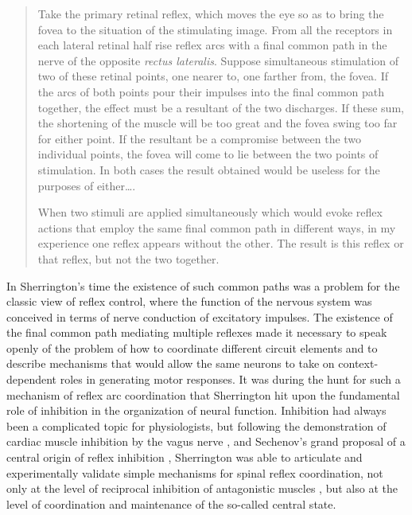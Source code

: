 \blockquote[{\protect\cite[p.461]{Sherrington1904}}]{Take the primary retinal reflex, which moves the eye so as to bring the fovea to the situation of the stimulating image. From all the receptors in each lateral retinal half rise reflex arcs with a final common path in the nerve of the opposite \emph{rectus lateralis}. Suppose simultaneous stimulation of two of these retinal points, one nearer to, one farther from, the fovea. If the arcs of both points pour their impulses into the final common path together, the effect must be a resultant of the two discharges. If these sum, the shortening of the muscle will be too great and the fovea swing too far for either point. If the resultant be a compromise between the two individual points, the fovea will come to lie between the two points of stimulation. In both cases the result obtained would be useless for the purposes of either\ldots.

When two stimuli are applied simultaneously which would evoke reflex actions that employ the same final common path in different ways, in my experience one reflex appears without the other. The result is this reflex or that reflex, but not the two together.}

In Sherrington's time the existence of such common paths was a problem for the classic view of reflex control, where the function of the nervous system was conceived in terms of nerve conduction of excitatory impulses. The existence of the final common path mediating multiple reflexes made it necessary to speak openly of the problem of how to coordinate different circuit elements and to describe mechanisms that would allow the same neurons to take on context-dependent roles in generating motor responses. It was during the hunt for such a mechanism of reflex arc coordination that Sherrington hit upon the fundamental role of inhibition in the organization of neural function. Inhibition had always been a complicated topic for physiologists, but following the demonstration of cardiac muscle inhibition by the vagus nerve \cite{Weber1846}, and Sechenov's grand proposal of a central origin of reflex inhibition \cite{Sechenov1863}, Sherrington was able to articulate and experimentally validate simple mechanisms for spinal reflex coordination, not only at the level of reciprocal inhibition of antagonistic muscles \cite{Sherrington1893b}, but also at the level of coordination and maintenance of the so-called central state.

